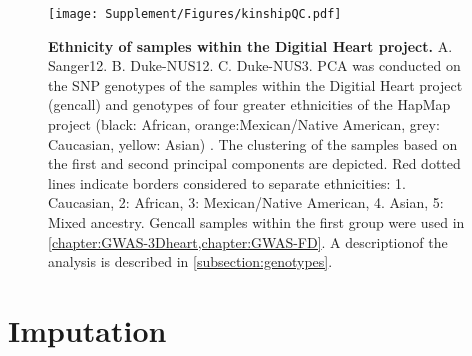 \begin{figure}[hbtp]
	\centering
	\texttt{[image: Supplement/Figures/kinshipQC.pdf]}
	\caption[\textbf{Ethnicity of samples within the Digitial Heart project. }]{\textbf{Ethnicity of samples within the Digitial Heart project.} A. Sanger12. B. Duke-NUS12. C. Duke-NUS3. PCA was conducted on the SNP genotypes of the samples within the Digitial Heart project (gencall) and genotypes of four greater ethnicities of the HapMap project (black: African, orange:Mexican/Native American, grey: Caucasian, yellow: Asian) \citep{HapMap2003,HapMap2005}. The clustering of the samples based on the first and second principal components are depicted. Red dotted lines indicate borders considered to separate ethnicities: 1. Caucasian, 2: African, 3: Mexican/Native American, 4. Asian, 5: Mixed ancestry. Gencall samples within the first group were used in \cref{chapter:GWAS-3Dheart,chapter:GWAS-FD}.  A descriptionof the analysis is described in \cref{subsection:genotypes}.}
 	\label{fig:kinshipQC}
\end{figure}

\newpage
\section{Imputation}

